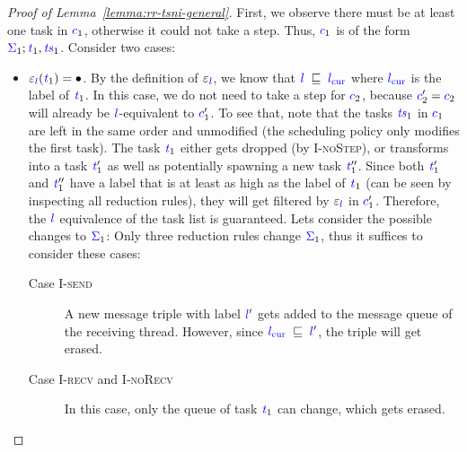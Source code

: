 \documentclass{sigplanconf}
\newcommand{\Varid}[1]{\mathit{#1}}
\begin{document}
\begin{proof}[Proof of Lemma~\ref{lemma:rr-tsni-general}]
  First, we observe there must be at least one task in \ensuremath{\ifc{c}_{1}}, otherwise
  it could not take a step.  Thus, \ensuremath{\ifc{c}_{1}} is of the form
  \ensuremath{\ifc{\Sigma}_{1};\ifc{\Varid{t}}_{1},\ifc{\Varid{ts}}_{1}}.  Consider two cases:
  \begin{itemize}
    \item $\ensuremath{\varepsilon_{\ifc{l}}(\ifc{\Varid{t}}_{1})}=\ensuremath{\bullet}$.
    By the definition of \ensuremath{\varepsilon_{\ifc{l}}}, we know that \ensuremath{\ifc{l}\;\flows{}\;\lcurr}
    where \ensuremath{\lcurr} is the label of \ensuremath{\ifc{\Varid{t}}_{1}}.
    In this case, we do not need to take a step for
    \ensuremath{\ifc{c}_{2}}, because \ensuremath{\ifc{c}_{2}'\mathrel{=}\ifc{c}_{2}} will already be \ensuremath{\ifc{l}}-equivalent to \ensuremath{\ifc{c}_{1}'}.
    To see that, note that the tasks \ensuremath{\ifc{\Varid{ts}}_{1}} in \ensuremath{\ifc{c}_{1}} are left in the
    same order and unmodified (the scheduling policy only
    modifies the first task). The task \ensuremath{\ifc{\Varid{t}}_{1}} either
    gets dropped (by \textsc{I-noStep}), or
    transforms into a task \ensuremath{\ifc{\Varid{t}}_{1}'} as well as potentially spawning a new
    task \ensuremath{\ifc{\Varid{t}}_{1}''}.  Since both \ensuremath{\ifc{\Varid{t}}_{1}'} and \ensuremath{\ifc{\Varid{t}}_{1}''} have a label that is
    at least as high as the label of \ensuremath{\ifc{\Varid{t}}_{1}} (can be seen
    by inspecting all reduction rules), they will get filtered
    by \ensuremath{\varepsilon_{\ifc{l}}} in \ensuremath{\ifc{c}_{1}'}.  Therefore, the \ensuremath{\ifc{l}} equivalence of the
    task list is guaranteed.
    Lets consider the possible changes to \ensuremath{\ifc{\Sigma}_{1}}:
    Only three reduction rules change \ensuremath{\ifc{\Sigma}_{1}},
    thus it suffices to consider these cases:
    \begin{description}
      \item[Case \textsc{I-send}]
      A new message triple with label \ensuremath{\ifc{l}'} gets added to the message
      queue of the receiving thread.  However, since \ensuremath{\lcurr\;\flows{}\;\ifc{l}'},
      the triple will get erased.
      \item[Case \textsc{I-recv} and \textsc{I-noRecv}]
      In this case, only the queue of
      task \ensuremath{\ifc{\Varid{t}}_{1}} can change, which gets erased.
    \end{description}

\end{itemize}
\end{proof}
\end{document}
